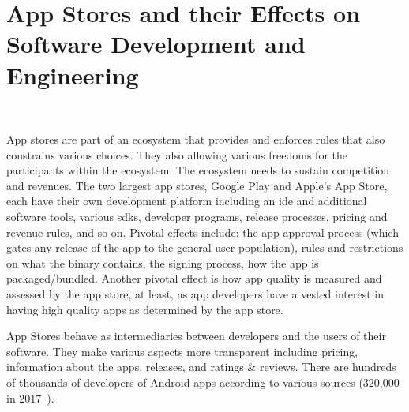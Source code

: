 \section{App Stores and their Effects on Software Development and Engineering}~\label{rw-app-stores-and-their-effects-on-software-development-and-engineering}

App stores are part of an ecosystem that provides and enforces rules that also constrains various choices. They also allowing various freedoms for the participants within the ecosystem. The ecosystem needs to sustain competition~ and revenues. The two largest app stores, Google Play and Apple's App Store, each have their own development platform including an \Gls{ide} and additional software tools, various \Glspl{sdk}, developer programs, release processes, pricing and revenue rules, and so on. 
Pivotal effects include: the app approval process (which gates any release of the app to the general user population), rules and restrictions on what the binary contains, the signing process, how the app is packaged/bundled. Another pivotal effect is how app quality is measured and assessed by the app store, at least, as app developers have a vested interest in having high quality apps as determined by the app store.

App Stores behave as intermediaries between developers and the users of their software. They make various aspects more transparent including pricing, information about the apps, releases, and ratings \& reviews. There are hundreds of thousands of developers of Android apps according to various sources (320,000 in 2017~). %


